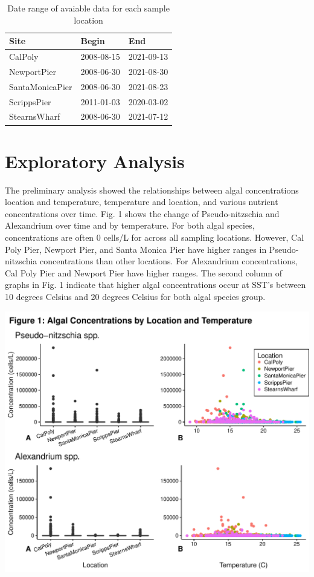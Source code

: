 \documentclass[
  12pt,
]{article}
\begin{document}
\begin{longtable}[t]{lll}
\caption{\label{tab:prelim data analysis}Date range of avaiable data for each sample location}\\
\toprule
Site & Begin & End\\
\midrule
CalPoly & 2008-08-15 & 2021-09-13\\
NewportPier & 2008-06-30 & 2021-08-30\\
SantaMonicaPier & 2008-06-30 & 2021-08-23\\
ScrippsPier & 2011-01-03 & 2020-03-02\\
StearnsWharf & 2008-06-30 & 2021-07-12\\
\bottomrule
\end{longtable}

\newpage

\hypertarget{exploratory-analysis}{%
\section{Exploratory Analysis}\label{exploratory-analysis}}

The preliminary analysis showed the relationships between algal
concentrations location and temperature, temperature and location, and
various nutrient concentrations over time. Fig. 1 shows the change of
Pseudo-nitzschia and Alexandrium over time and by temperature. For both
algal species, concentrations are often 0 cells/L for across all
sampling locations. However, Cal Poly Pier, Newport Pier, and Santa
Monica Pier have higher ranges in Pseudo-nitzschia concentrations than
other locations. For Alexandrium concentrations, Cal Poly Pier and
Newport Pier have higher ranges. The second column of graphs in Fig. 1
indicate that higher algal concentrations occur at SST's between 10
degrees Celsius and 20 degrees Celsius for both algal species group.

\includegraphics{Habs_Final_Report_files/figure-latex/Exploratory Analysis-1.pdf}
\end{document}
